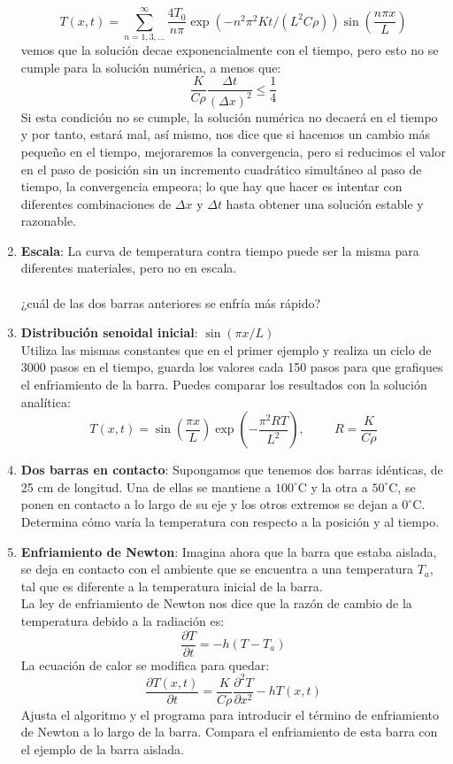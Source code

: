 \documentclass[12pt]{article}
\begin{document}
\begin{enumerate}
\[ T(x,t) = \sum_{n=1,3,\ldots}^{\infty} \dfrac{4T_{0}}{n \pi} \exp(-n^{2} \pi^{2}Kt/(L^{2} C \rho)) \sin \left( \dfrac{n \pi x}{L} \right)  \]
vemos que la soluci\'{o}n decae exponencialmente con el tiempo, pero esto no se cumple para la soluci\'{o}n num\'{e}rica, a menos que:
\[ \dfrac{K}{C \rho} \dfrac{\Delta t}{(\Delta x)^{2}} \leq \dfrac{1}{4} \]
Si esta condici\'{o}n no se cumple, la soluci\'{o}n numérica no decaer\'{a} en el tiempo y por tanto, estar\'{a} mal, as\'{i} mismo, nos dice que si hacemos un cambio m\'{a}s pequeño en el tiempo, mejoraremos la convergencia, pero si reducimos el valor en el paso de posici\'{o}n sin un incremento cuadr\'{a}tico simult\'{a}neo al paso de tiempo, la convergencia empeora; lo que hay que hacer es intentar con diferentes combinaciones de $\Delta x$ y $\Delta t$ hasta obtener una soluci\'{o}n estable y razonable.
\item \textbf{Escala}: La curva de temperatura contra tiempo puede ser la misma para diferentes materiales, pero no en escala.
\\
\\
¿cu\'{a}l de las dos barras anteriores se enfr\'{i}a m\'{a}s r\'{a}pido?
\item \textbf{Distribuci\'{o}n senoidal inicial}: $\sin( \pi x / L)$
\\
Utiliza las mismas constantes que en el primer ejemplo y realiza un ciclo de 3000 pasos en el tiempo, guarda los valores cada 150 pasos para que grafiques el enfriamiento de la barra. Puedes comparar los resultados con la soluci\'{o}n anal\'{i}tica:
\[ T(x,t) = \sin \left( \dfrac{\pi x}{L} \right) \exp(-\dfrac{\pi^{2}RT}{L^{2}}), \hspace{1cm} R=\dfrac{K}{C \rho} \]
\item \textbf{Dos barras en contacto}: Supongamos que tenemos dos barras id\'{e}nticas, de 25 cm de longitud. Una de ellas se mantiene a $100^{\circ}$C y la otra a $50^{\circ}$C, se ponen en contacto a lo largo de su eje y los otros extremos se dejan a $0^{\circ}$C.
\\
Determina c\'{o}mo var\'{i}a la temperatura con respecto a la posici\'{o}n y al tiempo.
\item \textbf{Enfriamiento de Newton}: Imagina ahora que la barra que estaba aislada, se deja en contacto con el ambiente que se encuentra a una temperatura $T_{a}$, tal que es diferente a la temperatura inicial de la barra.
\\
La ley de enfriamiento de Newton nos dice que la raz\'{o}n de cambio de la temperatura debido a la radiaci\'{o}n es:
\[ \dfrac{\partial T}{\partial t} = - h (T- T_{a}) \]
La ecuaci\'{o}n de calor se modifica para quedar:
\[ \dfrac{\partial T(x,t)}{\partial t} = \dfrac{K}{C \rho} \dfrac{\partial^{2}T}{\partial x^{2}} - h T(x,t)\]
Ajusta el algoritmo y el programa para introducir el t\'{e}rmino de enfriamiento de Newton a lo largo de la barra. Compara el enfriamiento de esta barra con el ejemplo de la barra aislada.
\end{enumerate}
\end{document}
